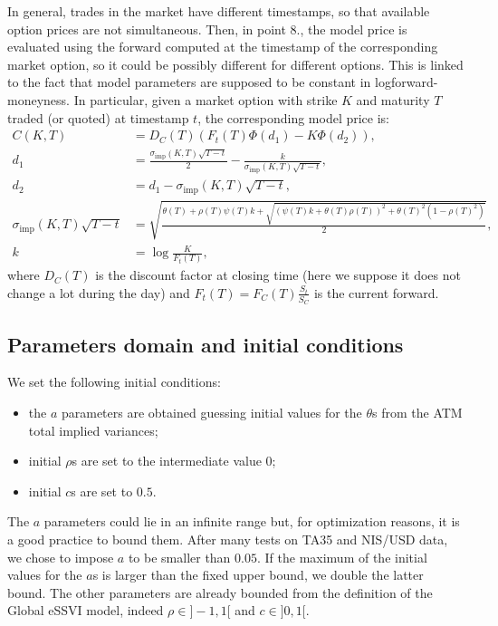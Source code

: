 \documentclass{article}
\providecommand{\tightlist}{%
      \setlength{\itemsep}{0pt}\setlength{\parskip}{0pt}}
\begin{document}
In general, trades in the market have different timestamps, so that
available option prices are not simultaneous. Then, in point 8., the
model price is evaluated using the forward computed at the timestamp of
the corresponding market option, so it could be possibly different for
different options. This is linked to the fact that model parameters are
supposed to be constant in logforward-moneyness. In particular, given a
market option with strike \(K\) and maturity \(T\) traded (or quoted) at
timestamp \(t\), the corresponding model price is: \begin{align*}
C(K,T) &= D_C(T)(F_t(T)\Phi(d_1) - K\Phi(d_2)),\\
d_1 &= \frac{\sigma_{\text{imp}}(K,T)\sqrt{T-t}}2 - \frac{k}{\sigma_{\text{imp}}(K,T)\sqrt{T-t}},\\
d_2 &= d_1-\sigma_{\text{imp}}(K,T)\sqrt{T-t},\\
\sigma_{\text{imp}}(K,T)\sqrt{T-t} &= \sqrt{\frac{\theta(T)+\rho(T)\psi(T) k + \sqrt{(\psi(T) k + \theta(T)\rho(T))^2 + \theta(T)^2(1-\rho(T)^2)}}{2}},\\
k &= \log\frac{K}{F_t(T)},
\end{align*} where \(D_C(T)\) is the discount factor at closing time
(here we suppose it does not change a lot during the day) and
\(F_t(T)=F_C(T)\frac{S_t}{S_C}\) is the current forward.

	\hypertarget{parameters-domain-and-initial-conditions}{%
\subsection{Parameters domain and initial
conditions}\label{parameters-domain-and-initial-conditions}}

	We set the following initial conditions:

\begin{itemize}
\tightlist
\item
  the \(a\) parameters are obtained guessing initial values for the
  \(\theta\)s from the ATM total implied variances;
\item
  initial \(\rho\)s are set to the intermediate value \(0\);
\item
  initial \(c\)s are set to \(0.5\).
\end{itemize}

	The \(a\) parameters could lie in an infinite range but, for
optimization reasons, it is a good practice to bound them. After many
tests on TA35 and NIS/USD data, we chose to impose \(a\) to be smaller
than \(0.05\). If the maximum of the initial values for the \(a\)s is
larger than the fixed upper bound, we double the latter bound. The other
parameters are already bounded from the definition of the Global eSSVI
model, indeed \(\rho\in]-1,1[\) and \(c\in]0,1[\).
\end{document}
